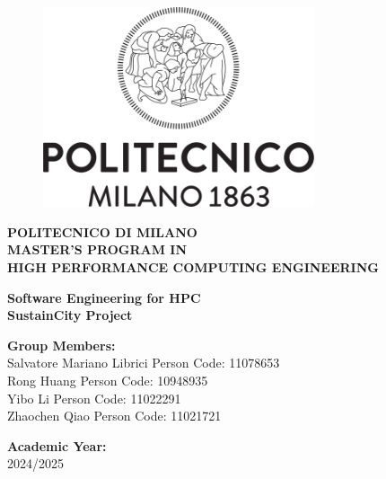 \begin{titlepage}
\begin{figure}[!htb]
    \centering
    \includegraphics[width=8cm]{Images/Logo_Politecnico_Milano.png}
\end{figure}

\begin{center}
    \LARGE{\textbf{POLITECNICO DI MILANO}} \\[2mm]
    
    \small{\textbf{MASTER'S PROGRAM IN}} \\[1mm]
    
    \small{\textbf{HIGH PERFORMANCE COMPUTING ENGINEERING}} \\[2mm]
\end{center}

\vspace*{\fill}

\begin{center}
    \Large{\textbf{Software Engineering for HPC}}\\
\Large{\textbf{SustainCity Project}}
\end{center}

\vspace*{\fill}

\begin{minipage}[t]{1\textwidth}
    \vspace{-10mm}
    {\small \textbf{Group Members:}}\\[2mm]
    {\small
    Salvatore Mariano Librici \hfill Person Code: 11078653\\
    Rong Huang \hfill Person Code: 10948935\\
    Yibo Li \hfill Person Code: 11022291\\
    Zhaochen Qiao \hfill Person Code: 11021721\\
    }
\end{minipage}



\vspace{10mm}

\begin{center}
    {\small{\textbf{Academic Year:}}{\small\vspace{0.5mm}
    \\ \small{2024/2025}}}  
\end{center}

\end{titlepage}
